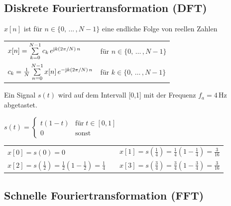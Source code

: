 \subsection{Diskrete Fouriertransformation (DFT)}

$x[n]$ ist für $n \in \{ 0, \, ... \, , N-1 \} $ eine endliche Folge von reellen Zahlen

\vspace{0.2cm}

\renewcommand{\arraystretch}{2.8}
\begin{tabular}{ll}
    $x[n] = \sum \limits_{k = 0}^{N-1} c_k \, e^{\mathrm{j} k (2 \pi / N) \, n}$                 & für $n \in \{ 0, \, \ldots \, , N-1 \}$ \\
    $c_k = \frac{1}{N} \sum \limits_{n = 0}^{N-1} x[n] \, e^{- \mathrm{j} k (2 \pi / N) \, n}  $ & für $k \in \{ 0, \, \ldots \, , N-1 \}$ 
\end{tabular}				
\renewcommand{\arraystretch}{1}



\begin{minipage}[c]{0.55\columnwidth}
    Ein Signal $s(t)$ wird auf dem Intervall [0,1] mit der Frequenz $f_a = 4 \, \text{Hz}$ abgetastet.
\end{minipage}
\hfill
\begin{minipage}[c]{0.44\columnwidth}
    $s(t) = \begin{cases}			
        t(1-t)  & \text{für} \; t \in [0,1] \\
        0       & \text{sonst} 
    \end{cases}$  
\end{minipage}

\vspace{0.2cm}

\renewcommand{\arraystretch}{2}
\begin{tabular}{lll}
    $x[0] = s(0) = 0$                                                                               & & 
    $x[1] = s\left( \frac{1}{4} \right) = \frac{1}{4} \left( 1 - \frac{1}{4} \right) = \frac{3}{16}$    \\
    $x[2] = s \left( \frac{1}{2} \right) = \frac{1}{2} \left(1- \frac{1}{2} \right) = \frac{1}{4}$  & &
    $x[3] = s \left( \frac{3}{4} \right) = \frac{3}{4} \left (1 - \frac{3}{4} \right) = \frac{3}{16}$
\end{tabular}
\renewcommand{\arraystretch}{1}


\subsection{Schnelle Fouriertransformation (FFT)}

